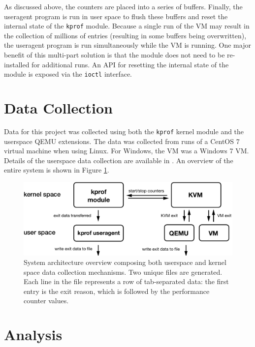 \documentclass[notitlepage]{article}
\begin{document}
As discussed above, the counters are placed into a series of buffers. Finally,
the useragent program is run in user space to flush these buffers and reset the
internal state of the \texttt{kprof} module. Because a single run of the VM may
result in the collection of millions of entries (resulting in some buffers being
overwritten), the useragent program is run simultaneously while the VM is
running. One major benefit of this multi-part solution is that the module does
not need to be re-installed for additional runs. An API for resetting the
internal state of the module is exposed via the \texttt{ioctl} interface.


\section{Data Collection}
\label{sec:data}
Data for this project was collected using both the \texttt{kprof} kernel module
and the userspace QEMU extensions. The data was collected from runs of a CentOS
7 virtual machine when using Linux. For Windows, the VM was a Windows 7 VM.
Details of the userspace data collection are available in \cite{f14}. An
overview of the entire system is shown in Figure \ref{fig:diagram}.

\begin{figure}[htp]
    \centering
    \includegraphics[width=4.5in]{diagram.pdf}
    \caption{System architecture overview composing both userspace and kernel
    space data collection mechanisms. Two unique files are generated. Each line
in the file represents a row of tab-separated data: the first entry is
the exit reason, which is followed by the performance counter values.}
    \label{fig:diagram}
\end{figure}


\section{Analysis}
\label{sec:analysis}
\end{document}

